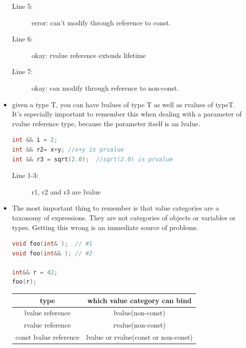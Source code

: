 \documentclass[a4paper,11pt,twoside]{book}
\newcommand{\tophline}{\hline }
\newcommand{\bottomhline}{\\ \hline }
\newcommand{\tophline}{ }
\newcommand{\bottomhline}{ }
\begin{document}
\begin{itemize}
\begin{description}
		\item[Line 5:] error: can't modify through reference to const.
		\item[Line 6:] okay: rvalue reference extends lifetime
		\item[Line 7:] okay: can modify through reference to non-const.
	\end{description}
	
	\item given a type T, you can have lvalues of type T as well as rvalues of typeT. It's especially important to remember this when dealing with a parameter of rvalue reference type, because the parameter itself is an lvalue.
\begin{lstlisting}[frame=single, language=c++, mathescape=true]
int && i = 2;  
int && r2= x+y; //x+y is prvalue
int && r3 = sqrt(2.0);  //sqrt(2.0) is prvalue 
\end{lstlisting}
\begin{description}
	\item[Line 1-3:] r1, r2 and r3 are lvalue
\end{description}

	\item The most important thing to remember is that value categories are a taxonomy of expressions. They are not categories of objects or variables or types. Getting this wrong is an immediate source of problems. 
\begin{lstlisting}[frame=single, language=c++, mathescape=true]
void foo(int& );  // #1
void foo(int&& ); // #2

int&& r = 42;
foo(r);
\end{lstlisting}
	
\begin{center}
		\begin{tabular}{|c|c|}
			\tophline 
			type & which value category can bind \\ 
			\tophline 
			lvalue reference & lvalue(non-const)  \\ 
			\tophline 
			rvalue reference &  rvalue(non-const)\\ 
			\tophline 
			const lvalue reference & lvalue or rvalue(const or non-const)  \bottomhline 
		\end{tabular} 
	\end{center}
	
	

\end{itemize}
\end{document}
